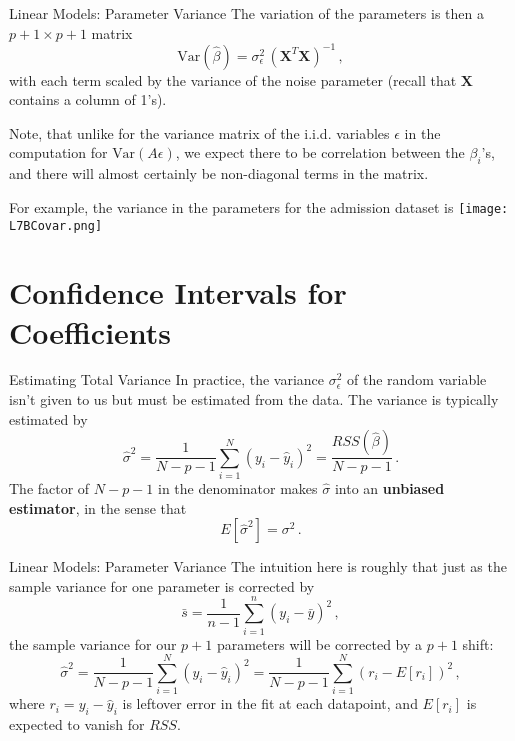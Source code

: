 \documentclass[10pt, table, dvipsnames,xcdraw, handout ]{beamer}
\newcommand{\bfX}{\ensuremath{\mathbf{X}}}
\begin{document}
\begin{frame}[fragile]{Linear Models: Parameter Variance}
The variation of the parameters is then a $p+1\times p+1$ matrix
$$
\text{Var}(\hat \beta) = \sigma^2_\epsilon\, (\bfX^T\bfX)^{-1} \,,
$$
 with each term scaled by the variance of the noise parameter (recall that $\bfX$ contains a column of 1's).\pause 

Note, that unlike for the variance matrix of the i.i.d. variables $\epsilon$ in the computation for $\text{Var}(A\epsilon)$, we expect there to be correlation between the $\beta_i$'s, and there will almost certainly be non-diagonal terms in the matrix. 
\end{frame}




\begin{frame}[fragile]
For example, the variance in the parameters for the admission dataset is 
	\centering \texttt{[image: L7BCovar.png]} 
\end{frame}




\section{Confidence Intervals for Coefficients }



\begin{frame}[fragile]{Estimating Total Variance}
In practice, the variance $\sigma^2_\epsilon$ of the random variable isn't given to us but must be estimated from the data. The variance is typically estimated by
$$
\hat \sigma^2 = \frac{1}{N-p-1}\sum_{i=1}^N(y_i - \hat y_i)^2 = \frac{RSS(\hat \beta)}{N-p-1}\,.
$$\pause
The factor of $N-p-1$ in the denominator makes $\hat \sigma$ into an \textbf{unbiased estimator}, in the sense that 
$$
E[\hat \sigma^2] = \sigma^2\,.
$$
\end{frame}





\begin{frame}[fragile]{Linear Models: Parameter Variance}
The intuition here is roughly that just as the sample variance for one parameter is corrected by 
$$
\bar{s} = \frac{1}{n-1}\sum_{i=1}^n(y_i-\bar{y})^2\,,
$$
the sample variance for our $p+1$ parameters will be corrected by a $p+1$ shift:
$$
\hat \sigma^2 = \frac{1}{N-p-1}\sum_{i=1}^N(y_i - \hat y_i)^2 = \frac{1}{N-p-1}\sum_{i=1}^N(r_i - E[r_i])^2\,,
$$
where $r_i = y_i - \hat{y}_i$ is leftover error in the fit at each datapoint, and $E[r_i] $ is expected to vanish for $RSS$.
\end{frame}
\end{document}
